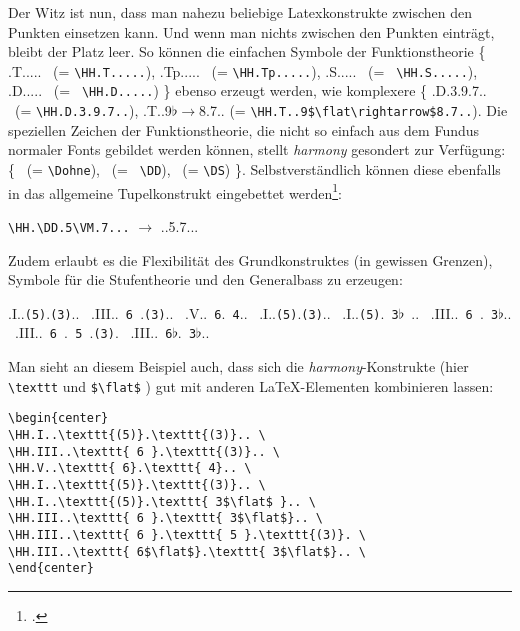 Der Witz ist nun, dass man nahezu beliebige Latexkonstrukte zwischen den Punkten
einsetzen kann. Und wenn man nichts zwischen den Punkten einträgt, bleibt der
Platz leer. So können die einfachen Symbole der Funktionstheorie \{ \HH.T..... 
\ (= \texttt{\small \textbackslash{HH.T.....}}), \HH.Tp.....  \ (=
\texttt{\small \textbackslash{HH.Tp.....}}), \HH.S.....  \ (= \texttt{\small
\textbackslash{HH.S.....}}), \HH.D.....  \ (= \texttt{\small
\textbackslash{HH.D.....}}) \} ebenso erzeugt werden, wie komplexere \{
\HH.D.3.9.7..  \ (= \texttt{\small \textbackslash{HH.D.3.9.7..}}),
\HH.T..9$\flat\rightarrow$8.7..  (= \verb|\HH.T..9$\flat\rightarrow$8.7..|).
Die speziellen Zeichen der Funktionstheorie, die nicht so einfach aus dem Fundus
normaler Fonts gebildet werden können, stellt  \textit{harmony} gesondert zur
Verfügung:
\{ \Dohne  \ (= \texttt{\small \textbackslash{Dohne}}), \DD \ (= \texttt{\small
\textbackslash{DD}}), \DS  \ (= \texttt{\small \textbackslash{DS}}) \}.
Selbstverständlich können diese ebenfalls in das allgemeine Tupelkonstrukt
eingebettet werden\footcite[Vgl. dazu][6]{WegWeg2007a}:
\begin{center}
 \texttt{\textbackslash{HH}.\textbackslash{DD}.5\textbackslash{VM}.7...} 
 $\rightarrow$ \HH.\DD.5\VM.7...
\end{center}

Zudem erlaubt es die Flexibilität des Grundkonstruktes (in gewissen Grenzen),
Symbole für die Stufentheorie und den Generalbass zu erzeugen:

\begin{center}
\HH.I..\texttt{(5)}.\texttt{(3)}.. \ 
\HH.III..\texttt{ 6 }.\texttt{(3)}.. \ 
\HH.V..\texttt{ 6}.\texttt{ 4}.. \ 
\HH.I..\texttt{(5)}.\texttt{(3)}.. \ 
\HH.I..\texttt{(5)}.\texttt{ 3$\flat$ }.. \ 
\HH.III..\texttt{ 6 }.\texttt{ 3$\flat$}.. \ 
\HH.III..\texttt{ 6 }.\texttt{ 5 }.\texttt{(3)}. \ 
\HH.III..\texttt{ 6$\flat$}.\texttt{ 3$\flat$}.. \ 
\end{center}

Man sieht an diesem Beispiel auch, dass sich die \textit{harmony}-Konstrukte (hier
\texttt{\textbackslash{texttt}} und \texttt{\$\textbackslash{flat}\$} ) gut mit
anderen \LaTeX-Elementen kombinieren lassen:
\begin{verbatim}
\begin{center}
\HH.I..\texttt{(5)}.\texttt{(3)}.. \ 
\HH.III..\texttt{ 6 }.\texttt{(3)}.. \ 
\HH.V..\texttt{ 6}.\texttt{ 4}.. \ 
\HH.I..\texttt{(5)}.\texttt{(3)}.. \ 
\HH.I..\texttt{(5)}.\texttt{ 3$\flat$ }.. \ 
\HH.III..\texttt{ 6 }.\texttt{ 3$\flat$}.. \ 
\HH.III..\texttt{ 6 }.\texttt{ 5 }.\texttt{(3)}. \ 
\HH.III..\texttt{ 6$\flat$}.\texttt{ 3$\flat$}.. \ 
\end{center}
\end{verbatim}


